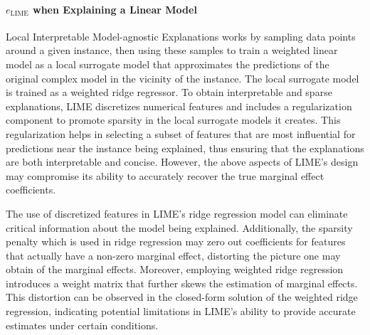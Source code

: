 \documentclass[mnsc,blindrev]{informs3}
\begin{document}
        \paragraph{$e_{\text{LIME}}$ when Explaining a Linear Model}
            \label{sec:lime_linear_case}
             Local Interpretable Model-agnostic Explanations works by sampling data points around a given instance, then using these samples to train a weighted linear model as a local surrogate model that approximates the predictions of the original complex model in the vicinity of the instance. The local surrogate model is trained as a weighted ridge regressor. To obtain interpretable and sparse explanations, LIME discretizes numerical features and includes a regularization component to promote sparsity in the local surrogate models it creates. This regularization helps in selecting a subset of features that are most influential for predictions near the instance being explained, thus ensuring that the explanations are both interpretable and concise. However, the above aspects of LIME's design may compromise its ability to accurately recover the true marginal effect coefficients. 
             
             The use of discretized features in LIME's ridge regression model can eliminate critical information about the  model being explained. Additionally, the sparsity penalty which is used in ridge regression may zero out coefficients for features that actually have a non-zero marginal effect, distorting the picture one may obtain of the marginal effects. Moreover, employing weighted ridge regression introduces a weight matrix that further skews the estimation of marginal effects. This distortion can be observed in the closed-form solution of the weighted ridge regression, indicating potential limitations in LIME's ability to provide accurate estimates under certain conditions.
             
\end{document}
